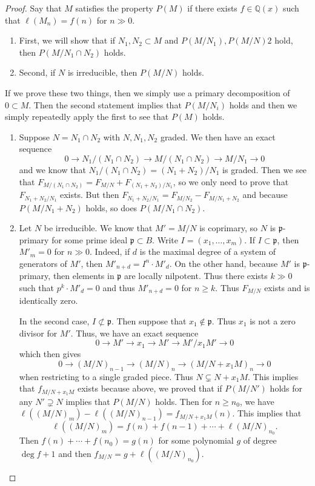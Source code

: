 \documentclass[leqno, openany]{memoir}
\theoremstyle{definition}
\theoremstyle{remark}
\theoremstyle{plain}
\theoremstyle{definition}
\theoremstyle{remark}
\newcommand{\Q}{\mathbb{Q}}
\newcommand{\mf}[1]{\mathfrak{#1}}
\begin{document}
\begin{proof}
    Say that $M$ satisfies the property $P(M)$ if there exists $f \in \Q(x)$ such that $\ell(M_n) = f(n)$ for $n \gg 0$. 
    \begin{enumerate}
        \item First, we will show that if $N_1, N_2 \subset M$ and $P(M/N_1), P(M/N)2$ hold, then $P(M/N_1 \cap N_2)$ holds.
        \item Second, if $N$ is irreducible, then $P(M/N)$ holds.
    \end{enumerate}
    If we prove these two things, then we simply use a primary decomposition of $0 \subset M$. Then the second statement implies that $P(M/N_i)$ holds and then we simply repeatedly apply the first to see that $P(M)$ holds.
    \begin{enumerate}
        \item Suppose $N = N_1 \cap N_2$ with $N, N_1, N_2$ graded. We then have an exact sequence
            \[ 0 \to N_1 / (N_1 \cap N_2) \to M / (N_1 \cap N_2) \to M/N_1 \to 0 \]
            and we know that $N_1 / (N_1 \cap N_2) = (N_1 + N_2) / N_1$ is graded. Then we see that $F_{M/(N_1 \cap N_2)} = F_{M/N} + F_{(N_1 + N_2)/N_1}$, so we only need to prove that $F_{N_1 + N_2 / N_1}$ exists. But then $F_{N_1 + N_2 / N_1} = F_{M / N_2} - F_{M/N_1 + N_2}$ and because $P(M/N_1 + N_2)$ holds, so does $P(M/N_1 \cap N_2)$.
        \item Let $N$ be irreducible. We know that $M' = M/N$ is coprimary, so $N$ is $\mf{p}$-primary for some prime ideal $\mf{p} \subset B$. Write $I = (x_1, \ldots, x_m)$. If $I \subset \mf{p}$, then $M'_m = 0$ for $n \gg 0$. Indeed, if $d$ is the maximal degree of a system of generators of $M'$, then $M'_{n+d} = I^n \cdot M'_d$. On the other hand, because $M'$ is $\mf{p}$-primary, then elements in $\mf{p}$ are locally nilpotent. Thus there exists $k \gg 0$ such that $p^k \cdot M'_d = 0$ and thus $M'_{n+d} = 0$ for $n \geq k$. Thus $F_{M/N}$ exists and is identically zero.

            In the second case, $I \not\subset \mf{p}$. Then suppose that $x_1 \notin \mf{p}$. Thus $x_1$ is not a zero divisor for $M'$. Thus, we have an exact sequence
            \[ 0 \to M' \to x_1 \to M' \to M'/x_1M' \to 0 \]
            which then gives
            \[ 0 \to (M/N)_{n-1} \to (M/N)_n \to (M/N+x_1 M)_n \to 0 \]
            when restricting to a single graded piece. Thus $N \subsetneq N + x_1 M$. This implies that $f_{M/N + x_1 M}$ exists because above, we proved that if $P(M/N')$ holds for any $N' \supsetneq N$ implies that $P(M/N)$ holds. Then for $n \geq n_0$, we have $\ell((M/N)_m) - \ell((M/N)_{n-1}) = f_{M/N + x_1 M}(n)$. This implies that
            \[ \ell((M/N)_m) = f(n) + f(n-1) + \cdots + \ell(M/N)_{n_0}. \]
            Then $f(n) + \cdots + f(n_0) = g(n)$ for some polynomial $g$ of degree $\deg f + 1$ and then $f_{M/N} = g + \ell((M/N)_{n_0})$.\qedhere
    \end{enumerate}
\end{proof}
\end{document}
